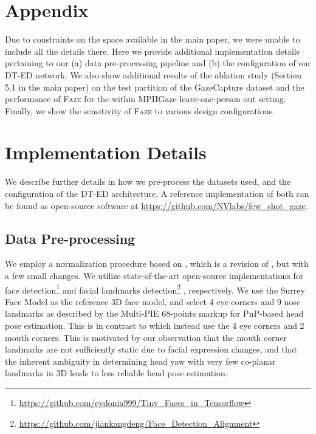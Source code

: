 \documentclass[10pt,twocolumn,letterpaper]{article}
\newcommand{\faze}[0]{\textsc{Faze}\xspace}
\begin{document}
\setcounter{section}{0}
\renewcommand{\thesection}{\Alph{section}}
\section*{\Large Appendix}
\noindent
Due to constraints on the space available in the main paper, we were unable to include all the details there. Here we provide additional implementation details pertaining to our (a) data pre-processing pipeline and (b) the configuration of our DT-ED network. We also show additional results of the ablation study (Section 5.1 in the main paper) on the test partition of the GazeCapture dataset and the performance of \faze for the within MPIIGaze leave-one-person out setting. Finally, we show the sensitivity of \faze to various design configurations.

\section{Implementation Details}
\noindent
We describe further details in how we pre-process the datasets used, and the configuration of the DT-ED architecture.
A reference implementation of both can be found as open-source software at \url{https://github.com/NVlabs/few_shot_gaze}.

\subsection{Data Pre-processing\label{sec:pre-processing}}
\noindent
We employ a normalization procedure based on \cite{Zhang2018ETRA}, which is a revision of \cite{Sugano2014CVPR}, but with a few small changes. We utilize state-of-the-art open-source implementations for face detection\footnote{\tiny\url{https://github.com/cydonia999/Tiny_Faces_in_Tensorflow}} \cite{Hu2017CVPR} and facial landmarks detection\footnote{\tiny\url{https://github.com/jiankangdeng/Face_Detection_Alignment}} \cite{Deng2018FG}, respectively.
 We use the Surrey Face Model \cite{Huber2016} as the reference 3D face model, and select 4 eye corners and 9 nose landmarks as described by the Multi-PIE 68-points markup \cite{Gross2010} for PnP-based \cite{lepetit2009epnp} head pose estimation. This is in contrast to \cite{Sugano2014CVPR,Zhang2018ETRA} which instead use the 4 eye corners and 2 mouth corners. This is motivated by our observation that the mouth corner landmarks are not sufficiently static due to facial expression changes, and that the inherent ambiguity in determining head yaw with very few co-planar landmarks in 3D leads to less reliable head pose estimation.
\end{document}
